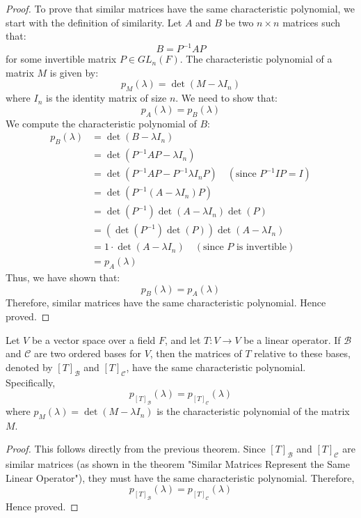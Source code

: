 \documentclass[openany]{book}
\begin{document}
\begin{proof}
    To prove that similar matrices have the same characteristic polynomial, we start with the definition of similarity. Let $A$ and $B$ be two $n \times n$ matrices such that:
    $$B = P^{-1}AP$$
    for some invertible matrix $P \in GL_n(F)$. The characteristic polynomial of a matrix $M$ is given by:
    $$p_M(\lambda) = \det(M - \lambda I_n)$$
    where $I_n$ is the identity matrix of size $n$. We need to show that:
    $$p_A(\lambda) = p_B(\lambda)$$
    We compute the characteristic polynomial of $B$:
    \[
    \begin{aligned}
    p_B(\lambda) &= \det(B - \lambda I_n) \\
    &= \det(P^{-1}AP - \lambda I_n) \\
    &= \det(P^{-1}AP - P^{-1}\lambda I_n P) \quad (\text{since } P^{-1}IP = I) \\
    &= \det(P^{-1}(A - \lambda I_n)P) \\
    &= \det(P^{-1})\det(A - \lambda I_n)\det(P) \\
    &= (\det(P^{-1})\det(P))\det(A - \lambda I_n) \\
    &= 1 \cdot \det(A - \lambda I_n) \quad (\text{since } P \text{ is invertible}) \\
    &= p_A(\lambda)
    \end{aligned}
    \]
    Thus, we have shown that:
    $$p_B(\lambda) = p_A(\lambda)$$
    Therefore, similar matrices have the same characteristic polynomial. Hence proved.
\end{proof}
\begin{corollary}
    Let $V$ be a vector space over a field $F$, and let $T: V \to V$ be a linear operator. If $\mathcal{B}$ and $\mathcal{C}$ are two ordered bases for $V$, then the matrices of $T$ relative to these bases, denoted by $[T]_{\mathcal{B}}$ and $[T]_{\mathcal{C}}$, have the same characteristic polynomial. Specifically,
    $$p_{[T]_{\mathcal{B}}}(\lambda) = p_{[T]_{\mathcal{C}}}(\lambda)$$
    where $p_M(\lambda) = \det(M - \lambda I_n)$ is the characteristic polynomial of the matrix $M$.
\end{corollary}
\begin{proof}
    This follows directly from the previous theorem. Since $[T]_{\mathcal{B}}$ and $[T]_{\mathcal{C}}$ are similar matrices (as shown in the theorem "Similar Matrices Represent the Same Linear Operator"), they must have the same characteristic polynomial. Therefore,
    $$p_{[T]_{\mathcal{B}}}(\lambda) = p_{[T]_{\mathcal{C}}}(\lambda)$$
    Hence proved.
\end{proof}
\end{document}
